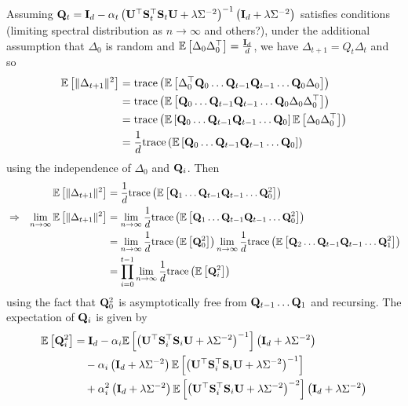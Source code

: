 \documentclass[10pt]{article}
\begin{document}
\todo Assuming $\mathbf{Q}_t=\mathbf{I}_d - \alpha_t\left(\mathbf{U}^\top\mathbf{S}_t^\top\mathbf{S}_t\mathbf{U} + \lambda\Sigma^{-2}\right)^{-1}\left(\mathbf{I}_d + \lambda\Sigma^{-2}\right)$ satisfies conditions (limiting spectral distribution as $n\rightarrow\infty$ and others?), under the additional assumption that $\Delta_0$ is random and $\mathbb{E}\left[\Delta_0\Delta_0^\top\right]=\frac{\mathbf{I}_d}{d}$, we have $\Delta_{t+1}=Q_t\Delta_t$ and so
\begin{align*}
\mathbb{E}\left[\|\Delta_{t+1}\|^2\right] &= \mathrm{trace}\left(\mathbb{E}\left[\Delta_0^\top\mathbf{Q}_0\ldots \mathbf{Q}_{t-1}\mathbf{Q}_{t-1}\ldots\mathbf{Q}_0\Delta_0\right]\right) \\
&= \mathrm{trace}\left(\mathbb{E}\left[\mathbf{Q}_0\ldots \mathbf{Q}_{t-1}\mathbf{Q}_{t-1}\ldots\mathbf{Q}_0\Delta_0\Delta_0^\top\right]\right) \\
&= \mathrm{trace}\left(\mathbb{E}\left[\mathbf{Q}_0\ldots \mathbf{Q}_{t-1}\mathbf{Q}_{t-1}\ldots\mathbf{Q}_0\right]\mathbb{E}\left[\Delta_0\Delta_0^\top\right]\right) \\
&= \frac{1}{d}\mathrm{trace}\left(\mathbb{E}\left[\mathbf{Q}_0\ldots \mathbf{Q}_{t-1}\mathbf{Q}_{t-1}\ldots\mathbf{Q}_0\right]\right)
\end{align*}
using the independence of $\Delta_0$ and $\mathbf{Q}_i$. Then
\begin{align*}
&& \mathbb{E}\left[\|\Delta_{t+1}\|^2\right] &= \frac{1}{d}\mathrm{trace}\left(\mathbb{E}\left[\mathbf{Q}_1\ldots \mathbf{Q}_{t-1}\mathbf{Q}_{t-1}\ldots\mathbf{Q}_0^2\right]\right) \\
&\Rightarrow & \lim_{n\rightarrow\infty}\mathbb{E}\left[\|\Delta_{t+1}\|^2\right] &= \lim_{n\rightarrow\infty}\frac{1}{d}\mathrm{trace}\left(\mathbb{E}\left[\mathbf{Q}_1\ldots \mathbf{Q}_{t-1}\mathbf{Q}_{t-1}\ldots\mathbf{Q}_0^2\right]\right) \\
&& &= \lim_{n\rightarrow\infty}\frac{1}{d}\mathrm{trace}\left(\mathbb{E}\left[\mathbf{Q}_0^2\right]\right)\lim_{n\rightarrow\infty}\frac{1}{d}\mathrm{trace}\left(\mathbb{E}\left[\mathbf{Q}_2\ldots \mathbf{Q}_{t-1}\mathbf{Q}_{t-1}\ldots\mathbf{Q}_1^2\right]\right) \\
&&&= \prod_{i=0}^{t-1}\lim_{n\rightarrow\infty}\frac{1}{d}\mathrm{trace}\left(\mathbb{E}\left[\mathbf{Q}_i^2\right]\right)
\end{align*}
using the fact that $\mathbf{Q}_0^2$ is asymptotically free from $\mathbf{Q}_{t-1}\ldots\mathbf{Q}_1$ and recursing. The expectation of $\mathbf{Q}_i$ is given by
\begin{align*}
\mathbb{E}\left[\mathbf{Q}_i^2\right] &= \mathbf{I}_d - \alpha_i\mathbb{E}\left[\left(\mathbf{U}^\top\mathbf{S}_i^\top\mathbf{S}_i\mathbf{U} + \lambda\Sigma^{-2}\right)^{-1}\right]\left(\mathbf{I}_d + \lambda\Sigma^{-2}\right) \\
&\quad - \alpha_i\left(\mathbf{I}_d + \lambda\Sigma^{-2}\right)\mathbb{E}\left[\left(\mathbf{U}^\top\mathbf{S}_i^\top\mathbf{S}_i\mathbf{U} + \lambda\Sigma^{-2}\right)^{-1}\right] \\
&\quad + \alpha_i^2\left(\mathbf{I}_d + \lambda\Sigma^{-2}\right)\mathbb{E}\left[\left(\mathbf{U}^\top\mathbf{S}_i^\top\mathbf{S}_i\mathbf{U} + \lambda\Sigma^{-2}\right)^{-2}\right]\left(\mathbf{I}_d + \lambda\Sigma^{-2}\right)
\end{align*}
\end{document}
